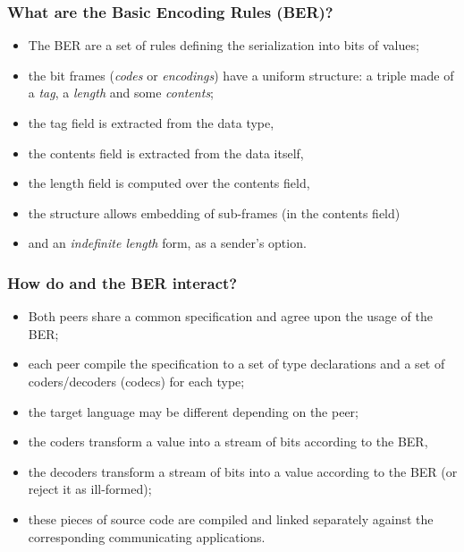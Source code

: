 \documentclass[compress,dvips,xcolor={dvipsnames},t]{beamer}
\begin{document}
%
\begin{frame}
\frametitle{What are the Basic Encoding Rules (BER)?}

\begin{itemize}

  \item The BER are a set of rules defining the serialization into
  bits of \ASN values;

  \item the bit frames (\emph{codes} or \emph{encodings}) have a
  uniform structure: a triple made of a \emph{tag}, a \emph{length}
  and some \emph{contents};

  \item the tag field is extracted from the data type,

  \item the contents field is extracted from the data itself,

  \item the length field is computed over the contents field,

  \item the structure allows embedding of sub-frames (in the contents
  field)

  \item and an \emph{indefinite length} form, as a sender's option.

\end{itemize}

\end{frame}

%
\begin{frame}
\frametitle{How do \ASN and the BER interact?}

\begin{itemize}

  \item Both peers share a common \ASN specification and agree upon
  the usage of the BER;

  \item each peer compile the \ASN specification to a set of type
  declarations and a set of coders/decoders (codecs) for each type;

  \item the target language may be different depending on the peer;

  \item the coders transform a value into a stream of bits according
  to the BER,

  \item the decoders transform a stream of bits into a value according
  to the BER (or reject it as ill-formed);

  \item these pieces of source code are compiled and linked separately
  against the corresponding communicating applications.

\end{itemize}

\end{frame}
\end{document}
